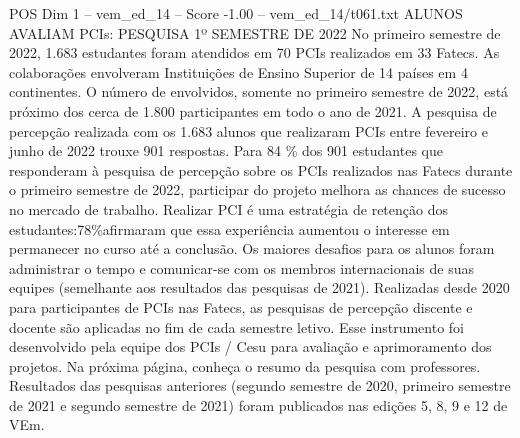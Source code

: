 \begin{textsample}{POS Dim 1 – vem\_ed\_14 – Score -1.00 – vem\_ed\_14/t061.txt}  \label{ex:f1_pos_073}
ALUNOS AVALIAM PCIs: PESQUISA 1º SEMESTRE DE 2022 No primeiro semestre de 2022, 1.683 estudantes foram atendidos em 70 PCIs realizados em 33 Fatecs.
As colaborações envolveram Instituições de Ensino Superior de 14 países em 4 continentes.
O número de envolvidos, somente no primeiro semestre de 2022, está próximo dos cerca de 1.800 participantes em todo o ano de 2021.
A pesquisa de percepção realizada com os 1.683 alunos que realizaram PCIs entre fevereiro e junho de 2022 trouxe 901 respostas.
Para 84 \% dos 901 estudantes que responderam à pesquisa de percepção sobre os PCIs realizados nas Fatecs durante o primeiro semestre de 2022, participar do projeto melhora as chances de sucesso no mercado de trabalho.
Realizar PCI é uma estratégia de retenção dos estudantes:78\%afirmaram que essa experiência aumentou o interesse em permanecer no curso até a conclusão.
Os maiores desafios para os alunos foram administrar o tempo e comunicar-se com os membros internacionais de suas equipes (semelhante aos resultados das pesquisas de 2021).
Realizadas desde 2020 para participantes de PCIs nas Fatecs, as pesquisas de percepção discente e docente são aplicadas no fim de cada semestre letivo.
Esse instrumento foi desenvolvido pela equipe dos PCIs / Cesu para avaliação e aprimoramento dos projetos.
Na próxima página, conheça o resumo da pesquisa com professores.
Resultados das pesquisas anteriores (segundo semestre de 2020, primeiro semestre de 2021 e segundo semestre de 2021) foram publicados nas edições 5, 8, 9 e 12 de VEm.

\end{textsample}
